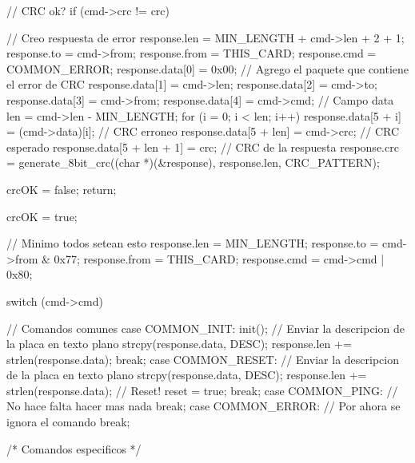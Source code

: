 \documentclass[a4paper,10pt]{article}
\begin{document}
{\begin{verbatimtab}
{	// CRC ok?
	if (cmd->crc != crc)
	{		
		// Creo respuesta de error
		response.len = MIN_LENGTH + cmd->len + 2 + 1;
		response.to = cmd->from;
		response.from = THIS_CARD;
		response.cmd = COMMON_ERROR;
		response.data[0] = 0x00;
		// Agrego el paquete que contiene el error de CRC
		response.data[1] = cmd->len;
		response.data[2] = cmd->to;
		response.data[3] = cmd->from;
		response.data[4] = cmd->cmd;
		// Campo data
		len = cmd->len - MIN_LENGTH;
		for (i = 0; i < len; i++)
			response.data[5 + i] = (cmd->data)[i];
		// CRC erroneo
		response.data[5 + len] = cmd->crc;
		// CRC esperado
		response.data[5 + len + 1] = crc;
		// CRC de la respuesta
		response.crc = generate_8bit_crc((char *)(&response), response.len, CRC_PATTERN);
	
		crcOK = false;
		return;
	}

	crcOK = true;
	
	// Minimo todos setean esto
	response.len = MIN_LENGTH;
	response.to = cmd->from & 0x77;
	response.from = THIS_CARD;
	response.cmd = cmd->cmd | 0x80;

	switch (cmd->cmd)
	{
		// Comandos comunes
		case COMMON_INIT: 
			init();
			// Enviar la descripcion de la placa en texto plano
			strcpy(response.data, DESC);
			response.len += strlen(response.data);
		break;
		case COMMON_RESET: 
			// Enviar la descripcion de la placa en texto plano
			strcpy(response.data, DESC);
			response.len += strlen(response.data);
			// Reset!
			reset = true;
		break;
		case COMMON_PING: 
			// No hace falta hacer mas nada
		break;
 		case COMMON_ERROR:
			// Por ahora se ignora el comando
		break;
		
		/* Comandos especificos */

}}
\end{verbatimtab}}
\end{document}
